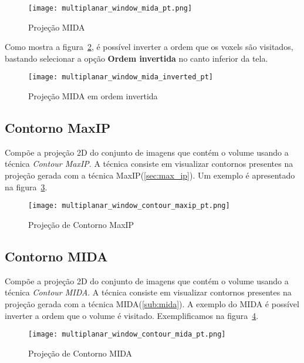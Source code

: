 \begin{figure}[H]
\centering
\texttt{[image: multiplanar\_window\_mida\_pt.png]}
\caption{Projeção MIDA}
\label{fig:proj_MIDA}
\end{figure}

Como mostra a figura~\ref{fig:proj_MIDA_inv}, é possível inverter a ordem que os voxels são visitados, bastando selecionar a opção \textbf{Ordem invertida} no canto inferior da tela.

\begin{figure}[H]
\centering
\texttt{[image: multiplanar\_window\_mida\_inverted\_pt]}
\caption{Projeção MIDA em ordem invertida}
\label{fig:proj_MIDA_inv}
\end{figure}

\subsection{Contorno MaxIP}

Compõe a projeção 2D do conjunto de imagens que contém o volume usando a técnica \textit{Contour MaxIP}. A técnica consiste em visualizar contornos presentes na projeção gerada com a técnica MaxIP(\ref{sec:max_ip}). Um exemplo é apresentado na figura~\ref{fig:proj_contorno_maxip}.

\begin{figure}[H]
\centering
\texttt{[image: multiplanar\_window\_contour\_maxip\_pt.png]}
\caption{Projeção de Contorno MaxIP}
\label{fig:proj_contorno_maxip}
\end{figure}

\subsection{Contorno MIDA}

Compõe a projeção 2D do conjunto de imagens que contém o volume usando a técnica \textit{Contour MIDA}. A técnica consiste em visualizar contornos presentes na projeção gerada com a técnica MIDA(\ref{sub:mida}). A exemplo do MIDA é possível inverter a ordem que o volume é visitado. Exemplificamos na figura~\ref{fig:proj_contorno_mida}.

\begin{figure}[H]
\centering
\texttt{[image: multiplanar\_window\_contour\_mida\_pt.png]}
\caption{Projeção de Contorno MIDA}
\label{fig:proj_contorno_mida}
\end{figure}